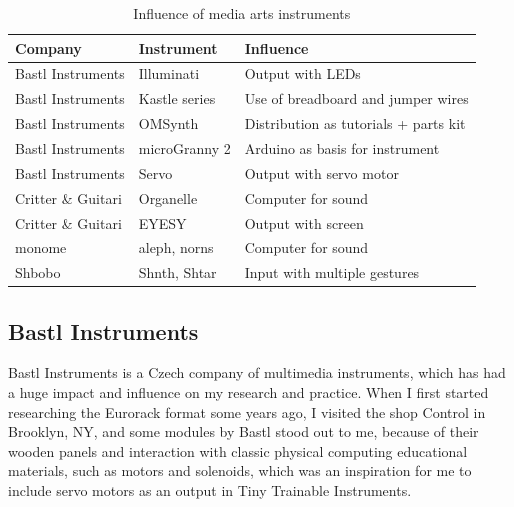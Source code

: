 \begin{table}[ht]
    \centering
    \begin{tabular}{ | l |  l | l |}
        \hline
        Company             & Instrument    & Influence                             \\
        \hline
        Bastl Instruments   & Illuminati    & Output with LEDs                      \\
        Bastl Instruments   & Kastle series & Use of breadboard and jumper wires    \\
        Bastl Instruments   & OMSynth       & Distribution as tutorials + parts kit \\
        Bastl Instruments   & microGranny 2 & Arduino as basis for instrument       \\
        Bastl Instruments   & Servo         & Output with servo motor               \\
        Critter \& Guitari  & Organelle     & Computer for sound                    \\
        Critter \& Guitari  & EYESY         & Output with screen                    \\
        monome              & aleph, norns  & Computer for sound                    \\
        Shbobo              & Shnth, Shtar  & Input with multiple gestures          \\
        \hline
    \end{tabular}
    \caption{Influence of media arts instruments}
    \label{table:media-arts-instruments-influence}
\end{table}{}

\subsection{Bastl Instruments}

Bastl Instruments is a Czech company of multimedia instruments, which has had a huge impact and influence on my research and practice. When I first started researching the Eurorack format some years ago, I visited the shop Control in Brooklyn, NY, and some modules by Bastl stood out to me, because of their wooden panels and interaction with classic physical computing educational materials, such as motors and solenoids, which was an inspiration for me to include servo motors as an output in Tiny Trainable Instruments.

